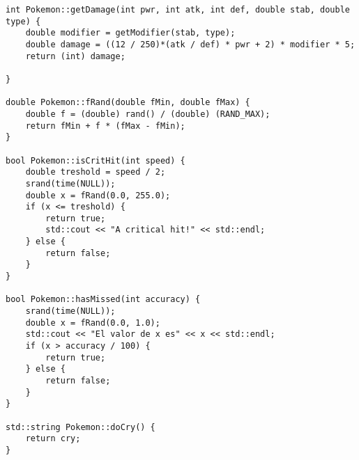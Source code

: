 \documentclass[11pt]{article}
\begin{document}
\begin{itemize}
\begin{lstlisting}
int Pokemon::getDamage(int pwr, int atk, int def, double stab, double type) {
    double modifier = getModifier(stab, type);
    double damage = ((12 / 250)*(atk / def) * pwr + 2) * modifier * 5;
    return (int) damage;

}

double Pokemon::fRand(double fMin, double fMax) {
    double f = (double) rand() / (double) (RAND_MAX);
    return fMin + f * (fMax - fMin);
}

bool Pokemon::isCritHit(int speed) {
    double treshold = speed / 2;
    srand(time(NULL));
    double x = fRand(0.0, 255.0);
    if (x <= treshold) {
        return true;
        std::cout << "A critical hit!" << std::endl;
    } else {
        return false;
    }
}

bool Pokemon::hasMissed(int accuracy) {
    srand(time(NULL));
    double x = fRand(0.0, 1.0);
    std::cout << "El valor de x es" << x << std::endl;
    if (x > accuracy / 100) {
        return true;
    } else {
        return false;
    }
}

std::string Pokemon::doCry() {
    return cry;
}
\end{lstlisting}


\end{itemize}
\end{document}
